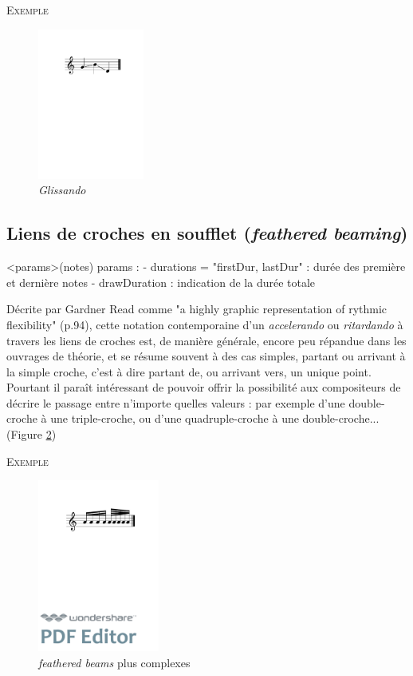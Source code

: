 \documentclass{article}
\newenvironment{gmncode}	{\vspace{-2mm}\small\verbatim}{\endverbatim\vspace{-2mm}}
\newcommand{\exemple}		{\vspace{2mm}\hspace*{-6mm}\textsc{Exemple}}
\begin{document}
\exemple
\begin{figure}[h]
\centering

\begin{gmncode}
  [ \glissando(g b d) ]
\end{gmncode}

\includegraphics[width=35mm]{img/glissando1.pdf}
\caption{\emph{Glissando}}
\label{fig:glissandoSimple}
\end{figure}




\subsection{Liens de croches en soufflet (\emph{feathered beaming})}\label{subsec:featheredBeaming}
\bigskip

\begin{gmncode}
  \fBeam<params>(notes)
  params : 
    - durations = "firstDur, lastDur" : 
      durée des première et dernière notes
    - drawDuration : 
      indication de la durée totale
\end{gmncode}

Décrite par Gardner Read comme "a highly graphic representation of rythmic flexibility"  \cite{read1969music} (p.94), cette notation contemporaine d'un \emph{accelerando} ou \emph{ritardando} à travers les liens de croches est, de manière générale, encore peu répandue dans les ouvrages de théorie, et se résume souvent à des cas simples, partant ou arrivant à la simple croche, c'est à dire partant de, ou arrivant vers, un unique point. Pourtant il paraît intéressant de pouvoir offrir la possibilité aux compositeurs de décrire le passage entre n'importe quelles valeurs : par exemple d'une double-croche à une triple-croche, ou d'une quadruple-croche à une double-croche... (Figure \ref{fig:fbeamcomplex})

\exemple
\begin{figure}[h]
\centering
\includegraphics[width=40mm]{img/fbeamcomplex.pdf}
\caption{\emph{feathered beams} plus complexes}
\label{fig:fbeamcomplex}
\end{figure}
\end{document}
